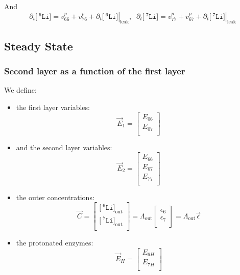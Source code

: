 \documentclass[aps,onecolumn,11pt]{revtex4}
\newcommand{\mychem}[1]{\mathtt{#1}}
\newcommand{\myconc}[1]{\big[#1\big]}
\newcommand{\spLi}[1]{{\!~^{#1}\mychem{Li}}}
\newcommand{\Li}[1]{\myconc{\spLi{#1}}}
\newcommand{\myleak}[1]{\left.{#1}\right\vert_{\mathrm{leak}}}
\newcommand{\myout}[1]{{#1}_{\mathrm{out}}}
\newcommand{\LiOut}[1]{\myout{\Li{#1}}}
\newcommand{\LiAll}{\Lambda}
\newcommand{\LiAllOut}{\myout{\LiAll}}
\begin{document}
And
\begin{equation}
	\partial_t \Li{6} = v^p_{66}+v^p_{76} + \partial_t \myleak{\Li{6}},\;\;
	\partial_t \Li{7} = v^p_{77}+v^p_{67} + \partial_t \myleak{\Li{7}}
\end{equation}

\subsection{Steady State}


\subsubsection{Second layer as a function of the first layer}

We define:
\begin{itemize}
\item the first layer variables:
\begin{equation}
	\vec{E}_1 = \begin{bmatrix}
	E_{06}\\
	E_{07}\\
	\end{bmatrix}
\end{equation}
\item and the second layer variables:
\begin{equation}
	\vec{E}_2 = \begin{bmatrix}
	E_{66}\\
	E_{67}\\
	E_{77}\\
	\end{bmatrix}
\end{equation}
\item the outer concentrations:
\begin{equation}
\label{eq:C}
	\vec{C} = 
	\begin{bmatrix}
	\LiOut{6}\\
	\LiOut{7}\\
	\end{bmatrix}
	=
	\LiAllOut
	\begin{bmatrix}
	\epsilon_6\\
	\epsilon_7\\
	\end{bmatrix}
	=
	\LiAllOut\vec{\epsilon}
\end{equation}
\item the protonated enzymes:
\begin{equation}
	\vec{E}_H = 
	\begin{bmatrix}
	E_{6H}\\
	E_{7H}\\
	\end{bmatrix}
\end{equation}

\end{itemize}
\end{document}
